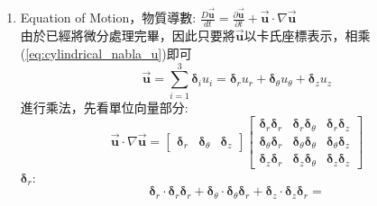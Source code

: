 \documentclass[../main.tex]{subfiles}
\begin{document}
\begin{itemize}
\begin{itemize}
\begin{enumerate}
\begin{equation}
\begin{bmatrix}
            \end{bmatrix}= \left(
            \begin{array}{ccc}
              \frac{\partial u_r}{\partial r} & \frac{\partial u_\theta}{\partial r} & \frac{\partial u_z}{\partial r} \\
              \frac{1}{r}\frac{\partial u_r}{\partial\theta} - \frac{u_\theta}{r} & 
              \frac{1}{r} \frac{\partial u_\theta}{\partial \theta}+\frac{u_r}{r} & 
              \frac{1}{r} \frac{\partial u_z}{\partial \theta} \\
              \frac{\partial u_r}{\partial z} & \frac{\partial u_\theta}{\partial z} & \frac{\partial u_z}{\partial z}
            \end{array}\right) \label{eq:cylindrical_nabla_u}
          \end{equation}
        \item Equation of Motion，物質導數: $\frac{D\vec{\bm u}}{dt} = \frac{\partial \vec{\bm u}}{\partial t} + \vec{\bm u} \cdot \nabla \vec{\bm u}$\\
          由於已經將微分處理完畢，因此只要將$\vec{\bm u}$以卡氏座標表示，相乘(\ref{eq:cylindrical_nabla_u})即可
          \begin{equation}
            \vec{\bm u} = \sum_{i=1}^3 \bm\delta_i u_i = \bm\delta_r u_r + \bm\delta_\theta u_\theta + \bm\delta_z u_z
          \end{equation}
          進行乘法，先看單位向量部分:
          \begin{equation}
            \vec{\bm u} \cdot \nabla \vec{\bm u} = \begin{bmatrix}
              \bm\delta_r  & \bm\delta_\theta & \bm\delta_z
            \end{bmatrix}
            \begin{bmatrix}
              \bm\delta_r\bm\delta_r & \bm\delta_r\bm\delta_\theta & \bm\delta_r\bm\delta_z \\
              \bm\delta_\theta\bm\delta_r & \bm\delta_\theta\bm\delta_\theta & \bm\delta_\theta\bm\delta_z \\
              \bm\delta_z\bm\delta_r & \bm\delta_z\bm\delta_\theta & \bm\delta_z\bm\delta_z
            \end{bmatrix}
          \end{equation}
          $\bm \delta_r$:
          \begin{equation}
            \bm\delta_r \cdot \bm\delta_r\bm\delta_r  +  \bm\delta_\theta \cdot \bm\delta_\theta\bm\delta_r + \bm\delta_z \cdot \bm\delta_z\bm\delta_r =

\end{equation}
\end{enumerate}
\end{itemize}
\end{itemize}
\end{document}
